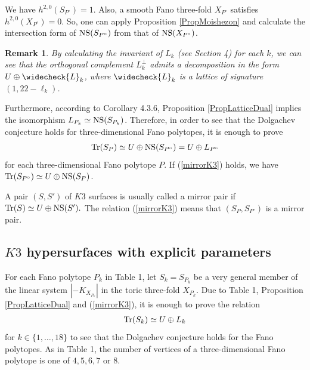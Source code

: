 \documentclass[10pt]{article}
\newtheorem{rem}{Remark}[section]
\begin{document}
We have $h^{2,0}(S_{P^\circ})=1$. 
Also, a smooth Fano three-fold $X_{P^\circ}$ satisfies $h^{2,0}(X_{P^\circ})=0$.
So,  one can apply Proposition \ref{PropMoishezon}
and calculate the intersection form of ${\rm NS}(S_{P^\circ})$  from that of ${\rm NS}(X_{P^\circ})$.
  

\begin{rem} \label{RemCheck}
By calculating the invariant of $L_k$ (see Section 4) for each $k$,
 we can see that the orthogonal complement $L_k^\perp$ admits a decomposition in the form $U\oplus \widecheck{L}_k$,
where $\widecheck{L}_k$ is a lattice of signature $(1,22-\ell_k)$.
 \end{rem}
 
 
 Furthermore, according to \cite{Kob} Corollary 4.3.6, 
  Proposition  \ref{PropLatticeDual} implies the isomorphism $L_{P_k}\simeq {\rm NS}(S_{P_k})$.
 Therefore, in order to see that the Dolgachev conjecture holds for three-dimensional Fano polytopes,
 it is enough to prove 
 \begin{align}\label{mirrorK3}
 {\rm Tr}(S_{P}) \simeq U \oplus {\rm NS}(S_{P^\circ}) =U \oplus L_{P^\circ}
 \end{align}
 for each  three-dimensional Fano polytope $P$.
If (\ref{mirrorK3}) holds, we have ${\rm Tr}(S_{P^\circ}) \simeq U \oplus {\rm NS}(S_{P})$.



A pair $(S,S')$ of  $K3$ surfaces is usually called a mirror pair if
$
{\rm Tr}(S) \simeq U \oplus {\rm NS}(S').
$
The relation (\ref{mirrorK3})  means that $(S_P, S_{P^\circ})$ is a mirror pair. 


\subsection{$K3$  hypersurfaces with explicit parameters}

For each Fano polytope $P_k$ in Table 1,
let  $S_k=S_{P_k}$ be a very general member of the linear system $ |-K_{X_{P_k}}| $ in the toric three-fold $X_{P_k}$.
Due to Table 1,  Proposition \ref{PropLatticeDual} and (\ref{mirrorK3}),
it is enough to prove the relation
\begin{align}\label{K3mirrorF}
{\rm Tr}(S_k) \simeq U \oplus L_{k}
\end{align}
for $k\in \{1,\ldots, 18\}$ to see that the Dolgachev conjecture holds for the Fano polytopes.
As in Table 1,
the number of vertices of a three-dimensional Fano polytope is one of $4,5,6,7$ or $8$.
\end{document}
